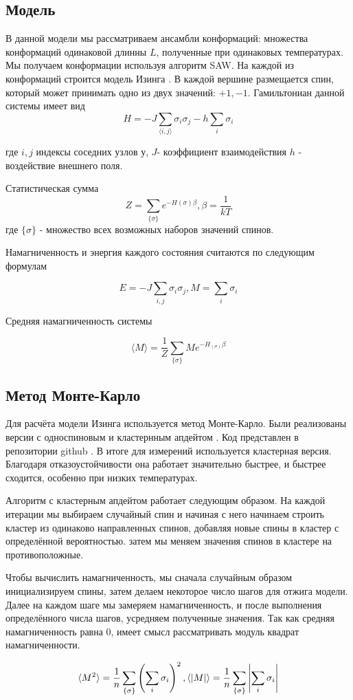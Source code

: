 \subsection{Модель}
В данной модели мы рассматриваем ансамбли конформаций: множества конформаций одинаковой длинны $L$, полученные при одинаковых температурах. Мы получаем конформации используя алгоритм SAW.
На каждой из конформаций строится модель Изинга \cite{ising}. В каждой вершине размещается спин, который может принимать одно из двух значений: $+1, -1$.
Гамильтониан данной системы имеет вид
\[H = -J\sum_{\langle i, j\rangle}{\sigma_i\sigma_j} - h\sum_i{\sigma_i} \]

где $i, j$ индексы соседних узлов у, $J$- коэффициент взаимодействия $h$ - воздействие внешнего поля.

Статистическая сумма
\[Z = \sum_{\{\sigma\}} e^{-H(\sigma)\beta}, \beta = \frac{1}{kT}\]
где $\{\sigma\}$ - множество всех возможных наборов значений спинов.

Намагниченность и энергия каждого состояния считаются по следующим формулам

\[ 
E = -J\sum_{i, j} \sigma_i \sigma_j, 
M = \sum_i \sigma_i
\]

Средняя намагниченность системы

\[
\langle M \rangle = \frac{1}{Z}  \sum_{\{\sigma\}} M e^{-H_{(\sigma)}\beta}
\]

\subsection{Метод Монте-Карло}
Для расчёта модели Изинга используется метод Монте-Карло. Были реализованы версии с односпиновым и кластернным апдейтом \cite{wolf_algorithm}. Код представлен в репозитории github \cite{github}. В итоге для измерений используется кластерная версия. Благодаря отказоустойчивости она работает значительно быстрее, и быстрее сходится, особенно при низких температурах.

Алгоритм с кластерным апдейтом работает следующим образом. На каждой итерации мы выбираем случайный спин и начиная с него начинаем строить кластер из одинаково направленных спинов, добавляя новые спины в кластер с определённой вероятностью. затем мы меняем значения спинов в кластере на противоположные.

Чтобы вычислить намагниченность, мы сначала случайным образом инициализируем спины, затем делаем некоторое число шагов для отжига модели. Далее на каждом шаге мы замеряем намагниченность, и после выполнения определённого числа шагов, усредняем полученные значения. Так как средняя намагниченность равна 0, имеет смысл рассматривать модуль квадрат намагниченности.

\[
\langle M^2\rangle = \frac{1}{n} \sum_{\{\sigma\}} \left( \sum_i \sigma_i \right)^2, \\
\langle |M|\rangle = \frac{1}{n} \sum_{\{\sigma\}} \left| \sum_i \sigma_i \right|
\]